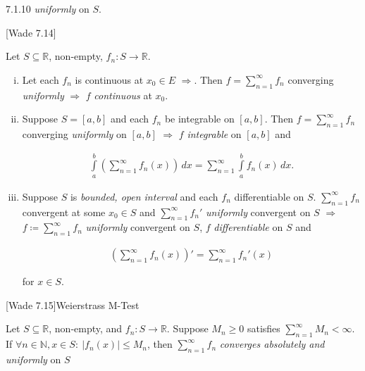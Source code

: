 \documentclass[10pt]{article} %
\newcommand{\cw}[1]{[Wade #1]}
\renewcommand{\leq}{\leqslant}
\renewcommand{\geq}{\geqslant}
\begin{document}
\begin{multicols}{3}
\begin{exercise}{7.1.10}{}
    \emph{uniformly} on $S$.

\end{exercise}

\begin{theorem}{\cw{7.14}}{}

    Let $S \subseteq \mathbb{R}$, non-empty, $f_n: S \to \mathbb{R}$.

        \begin{enumerate}[i)]
            \setlength{\parskip}{0em}
            \item Let each $f_n$ is continuous at $x_0 \in E$ $\Rightarrow$. Then $f = \sum_{n=1}^{\infty} f_n$ converging \emph{uniformly} $\Rightarrow$ $f$ \emph{continuous} at $x_0$.
            \item Suppose $S = [a,b]$ and each $f_n$ be integrable on $[a,b]$. Then $f = \sum_{n=1}^{\infty} f_n$ converging \emph{uniformly} on $[a,b]$ $\Rightarrow$ $f$ \emph{integrable} on $[a,b]$ and

                \begin{align*}
                    \int\limits_a^b \left(\sum_{n=1}^{\infty} f_n(x) \right) \,dx = \sum_{n=1}^{\infty} \int\limits_a^b f_n(x) \,dx.
                \end{align*}
            \item Suppose $S$ is \emph{bounded, open interval} and each $f_n$ differentiable on $S$. $\sum_{n=1}^{\infty} f_n$ convergent at some $x_0 \in S$ and $\sum_{n=1}^{\infty} f_n'$ \emph{uniformly} convergent on $S$ $\Rightarrow$ $f \coloneqq \sum_{n=1}^{\infty} f_n$ \emph{uniformly} convergent on $S$, $f$ \emph{differentiable} on $S$ and

                \begin{align*}
                    \left( \sum_{n=1}^{\infty} f_n(x) \right)' = \sum_{n=1}^{\infty} f_n'(x)
                \end{align*}

            for $x \in S$.
        \end{enumerate}

\end{theorem}

\begin{theorem}{\cw{7.15}}{Weierstrass M-Test}

    Let $S \subseteq \mathbb{R}$, non-empty, and $f_n: S \to \mathbb{R}$. Suppose $M_n \geq 0$ satisfies $\sum_{n = 1}^{\infty} M_n < \infty$. If $\forall n \in \mathbb{N}, x \in S:\ |f_n(x)| \leq M_n$, then $\sum_{n = 1}^{\infty} f_n$ \emph{converges absolutely and uniformly} on $S$


\end{theorem}
\end{multicols}
\end{document}
